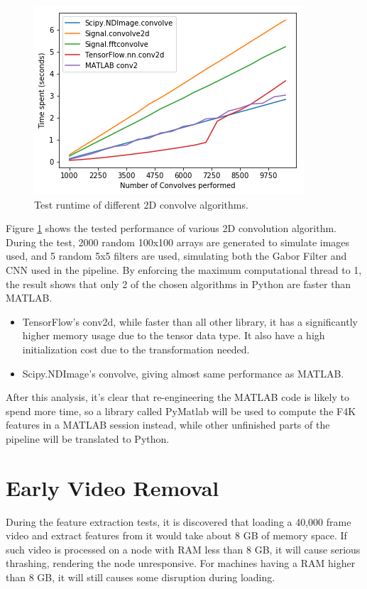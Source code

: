 \documentclass[bsc,logo,twoside,fullspacing,parskip]{infthesis}
\begin{document}
\begin{figure}[h]
    \centering
    \includegraphics[scale=0.5]{graph/benchmark.png}
    \caption{Test runtime of different 2D convolve algorithms.}
    \label{fig:benchmark}
\end{figure}

Figure \ref{fig:benchmark} shows the tested performance of various 2D convolution algorithm. During the test, 2000 random 100x100 arrays are generated to simulate images used, and 5 random 5x5 filters are used, simulating both the Gabor Filter and CNN used in the pipeline. By enforcing the maximum computational thread to 1, the result shows that only 2 of the chosen algorithms in Python are faster than MATLAB.
\begin{itemize}
\item
TensorFlow's conv2d, while faster than all other library, it has a significantly higher memory usage due to the tensor data type. It also have a high initialization cost due to the transformation needed.
\item
Scipy.NDImage's convolve, giving almost same performance as MATLAB.
\end{itemize}

After this analysis, it's clear that re-engineering the MATLAB code is likely to spend more time, so a library called PyMatlab will be used to compute the F4K features in a MATLAB session instead, while other unfinished parts of the pipeline will be translated to Python.

\section{Early Video Removal}
\label{sec:earlyremove}

During the feature extraction tests, it is discovered that loading a 40,000 frame video and extract features from it would take about 8 GB of memory space. 
If such video is processed on a node with RAM less than 8 GB, it will cause serious thrashing, rendering the node unresponsive. For machines having a RAM higher than 8 GB, it will still causes some disruption during loading.  
\end{document}
